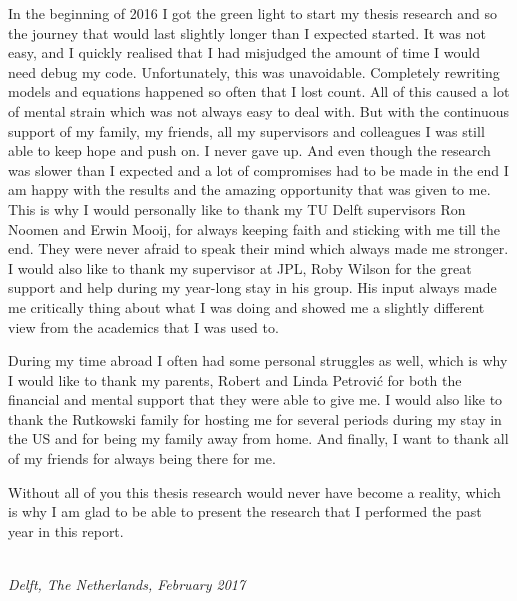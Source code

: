 In the beginning of 2016 I got the green light to start my thesis research and so the journey that would last slightly longer than I expected started. It was not easy, and I quickly realised that I had misjudged the amount of time I would need debug my code. Unfortunately, this was unavoidable. Completely rewriting models and equations happened so often that I lost count. All of this caused a lot of mental strain which was not always easy to deal with. But with the continuous support of my family, my friends, all my supervisors and colleagues I was still able to keep hope and push on. I never gave up. And even though the research was slower than I expected and a lot of compromises had to be made in the end I am happy with the results and the amazing opportunity that was given to me. This is why I would personally like to thank my TU Delft supervisors Ron Noomen and Erwin Mooij, for always keeping faith and sticking with me till the end. They were never afraid to speak their mind which always made me stronger. I would also like to thank my supervisor at \ac{JPL}, Roby Wilson for the great support and help during my year-long stay in his group. His input always made me critically thing about what I was doing and showed me a slightly different view from the academics that I was used to. 

During my time abroad I often had some personal struggles as well, which is why I would like to thank my parents, Robert and Linda Petrovi\'{c} for both the financial and mental support that they were able to give me. I would also like to thank the Rutkowski family for hosting me for several periods during my stay in the US and for being my family away from home. And finally, I want to thank all of my friends for always being there for me. 

Without all of you this thesis research would never have become a reality, which is why I am glad to be able to present the research that I performed the past year in this report. 


\begin{flushright}
{\makeatletter\itshape
    \@author \\
    Delft, The Netherlands, February 2017
\makeatother}
\end{flushright}

